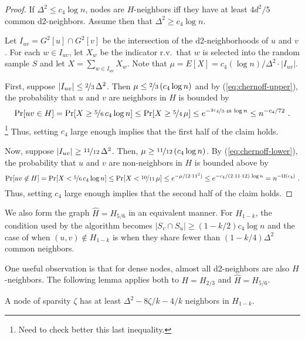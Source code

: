\begin{proof}
If $\Delta^2 \le c_4\log n$, nodes are $H$-neighbors iff they have at least $4d^2/5$ common d2-neighbors. Assume then that $\Delta^2 \ge c_4\log n$.

Let $I_{uv} = G^2[u]\cap G^2[v]$ be the intersection of the d2-neighborhoods of $u$ and $v$. 
For each $w \in I_{uv}$, let $X_w$ be the indicator r.v.\ that $w$ is
selected into the random sample $S$ and let $X = \sum_{w \in I_{uv}} X_w$. Note that $\mu = E[X] = c_4 (\log n)/\Delta^2 \cdot |I_{uv}|$.

First, suppose $|I_{uv}| \le \nicefrac{2}{3}\, \Delta^2$.
Then $\mu \le \nicefrac{2}{3}\, (c_4\log n)$ and
by (\ref{eq:chernoff-upper}), the probability that $u$ and $v$ are neighbors in $H$ is bounded by
  \[ \Pr[uv \in H] = \Pr[X \ge \nicefrac{5}{6}\, c_4 \log n]
\le \Pr[X \ge \nicefrac{5}{4}\,\mu] \le e^{-\nicefrac{2c_4}{3\cdot 48}\, \log n} \le n^{-c_4/72}\ . \]
\footnote{Need to check better this last inequality.} 
Thus, setting $c_4$ large enough implies that the first half of the claim holds.

Now, suppose $|I_{uv}| \ge \nicefrac{11}{12}\, \Delta^2$.
Then, $\mu \ge \nicefrac{11}{12}\, (c_4\log n)$.
By (\ref{eq:chernoff-lower}), the probability that $u$ and $v$ are non-neighbors in $H$ is bounded above by
  \[ \Pr[uv \not\in H] = \Pr[X < \nicefrac{5}{6}\, c_4 \log n]
\le \Pr[X < \nicefrac{10}{11}\,\mu] \le e^{-\mu/(2\cdot 11^2)} \le e^{-c_4/(2\cdot 11 \cdot 12)\, \log n} = n^{-\Omega(c_4)}\ . \]
Thus, setting $c_4$ large enough implies that the second half of the claim holds.
\end{proof}


We also form the graph $\hat{H} = H_{5/6}$ in an equivalent manner.
For $H_{1-k}$, the condition used by the algorithm becomes $|S_v \cap S_u| \ge (1-k/2)c_4 \log n$ and the case of when $(u,v) \not\in H_{1-k}$ is when they share fewer than $(1-k/4)\Delta^2$ common neighbors.


One useful observation is that for dense nodes, almost all d2-neighbors are also $H$-neighbors. The following lemma applies both to $H = H_{2/3}$ and $\hat{H} = H_{5/6}$.

\begin{lemma}
A node of sparsity $\zeta$ has at least $\Delta^2 - 8\zeta/k -4/k$ neighbors in $H_{1-k}$. 
\label{L:h-degree}
\end{lemma}
 
